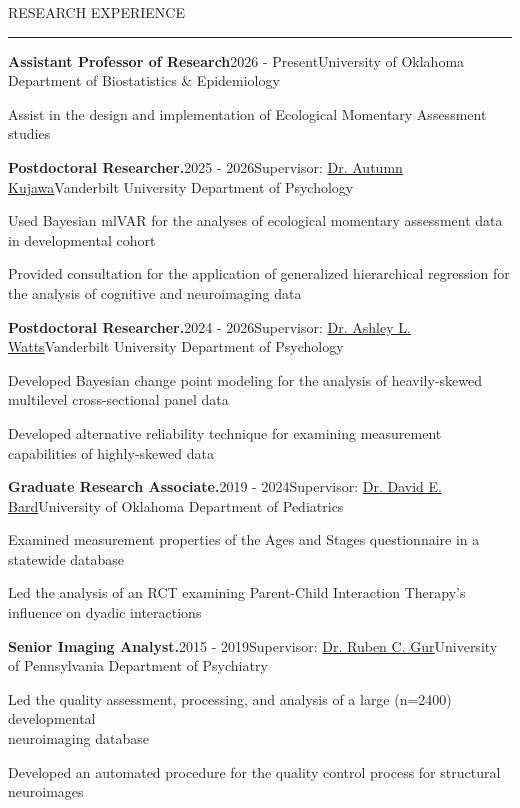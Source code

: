 \documentclass{resume} %
\renewenvironment{rSection}[1]{
	\sectionskip
	\textcolor{CarnegieMellonRed}{\MakeUppercase{#1}}
	\sectionlineskip
	\hrule
	\begin{list}{}{
			\setlength{\leftmargin}{1.5em}
		}
		\item[]
	}{
	\end{list}
}
\begin{document}
	\begin{rSection}{Research Experience}
		\begin{rSubsection}{\textbf{Assistant Professor of Research}}{2026 - Present}{}{University of Oklahoma Department of Biostatistics \& Epidemiology}
			\item Assist in the design and implementation of Ecological Momentary Assessment studies
		\end{rSubsection}
		
		\begin{rSubsection}{\textbf{Postdoctoral Researcher.}}{2025 - 2026}{Supervisor: \href{https://www.vanderbilt.edu/psychological_sciences/bio/autumn-kujawa}{Dr. Autumn Kujawa}}{Vanderbilt University Department of Psychology}
			\item Used Bayesian mlVAR for the analyses of ecological momentary assessment data in developmental cohort
			\item Provided consultation for the application of generalized hierarchical regression for the analysis of cognitive and neuroimaging data
		\end{rSubsection}
		
		\begin{rSubsection}{\textbf{Postdoctoral Researcher.}}{2024 - 2026}{Supervisor: \href{https://www.vanderbilt.edu/psychological_sciences/bio/ashley-watts}{Dr. Ashley L. Watts}}{Vanderbilt University Department of Psychology}
			\item Developed Bayesian change point modeling for the analysis of heavily-skewed multilevel cross-sectional panel data
			\item Developed alternative reliability technique for examining measurement capabilities of highly-skewed data
		\end{rSubsection}
		
		
		\begin{rSubsection}{\textbf{Graduate Research Associate.}}{2019 - 2024}{Supervisor: \href{https://research.ouhsc.edu/about/administration/details/david-bard-phd}{Dr. David E. Bard}}{University of Oklahoma Department of Pediatrics}
			\item Examined measurement properties of the Ages and Stages questionnaire in a statewide database
			\item Led the analysis of an RCT examining Parent-Child Interaction Therapy's influence on dyadic interactions  
		\end{rSubsection}
		
		\begin{rSubsection}{\textbf{Senior Imaging Analyst.}}{2015 - 2019}{Supervisor: \href{https://www.med.upenn.edu/bbl/faculty-rcgur.html}{Dr. Ruben C. Gur}}{University of Pennsylvania Department of Psychiatry}
			\item Led the quality assessment, processing, and analysis of a large (n=2400) developmental\\ neuroimaging database
			\item Developed an automated procedure for the quality control process for structural neuroimages 
		\end{rSubsection}
		
	\end{rSection}
	
\end{document}
